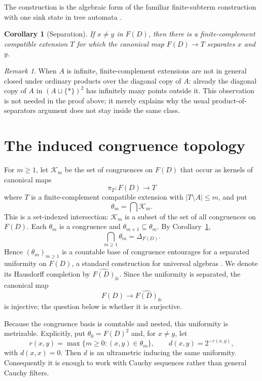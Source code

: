 \documentclass{birkau}
\newtheorem{corollary}[theorem]{Corollary}
\theoremstyle{definition}
\theoremstyle{remark}
\newtheorem{remark}[theorem]{Remark}
\begin{document}
The construction is the algebraic form of the familiar finite-subterm
construction with one sink state in tree automata \cite{ComonEtAl2008}.

\begin{corollary}[Separation]
\label{cor:finite-complement-separation}
If $x\ne y$ in $F(D)$, then there is a finite-complement compatible extension
$T$ for which the canonical map $F(D)\to T$ separates $x$ and $y$.
\end{corollary}

\begin{remark}
When $A$ is infinite, finite-complement extensions are not in general closed
under ordinary products over the diagonal copy of $A$: already the diagonal
copy of $A$ in $(A\sqcup\{\ast\})^2$ has infinitely many points outside it.
This observation is not needed in the proof above; it merely explains why the
usual product-of-separators argument does not stay inside the same class.
\end{remark}

\section{The induced congruence topology}\label{sec:completion}

For $m\ge1$, let $\mathcal K_m$ be the set of congruences on $F(D)$ that occur
as kernels of canonical maps
\[
 \pi_T:F(D)\longrightarrow T
\]
where $T$ is a finite-complement compatible extension with
$|T\setminus A|\le m$, and put
\[
 \theta_m=\bigcap\mathcal K_m.
\]
This is a set-indexed intersection: $\mathcal K_m$ is a subset of the set of
all congruences on $F(D)$.  Each $\theta_m$ is a congruence and
$\theta_{m+1}\subseteq\theta_m$.  By
Corollary~\ref{cor:finite-complement-separation},
\[
 \bigcap_{m\ge1}\theta_m=\Delta_{F(D)}.
\]
Hence $(\theta_m)_{m\ge1}$ is a countable base of congruence entourages for a
separated uniformity on $F(D)$, a standard construction for universal algebras
\cite{BulmanFleming1971}.  We denote its Hausdorff completion by
$\widehat{F(D)}_{\mathrm{fc}}$.  Since the uniformity is separated, the
canonical map
\[
 F(D)\longrightarrow\widehat{F(D)}_{\mathrm{fc}}
\]
is injective; the question below is whether it is surjective.

Because the congruence basis is countable and nested, this uniformity is
metrizable.  Explicitly, put $\theta_0=F(D)^2$ and, for $x\ne y$, let
\[
 r(x,y)=\max\{m\ge0:(x,y)\in\theta_m\},
 \qquad d(x,y)=2^{-r(x,y)},
\]
with $d(x,x)=0$.  Then $d$ is an ultrametric inducing the same uniformity.
Consequently it is enough to work with Cauchy sequences rather than general
Cauchy filters.
\end{document}
